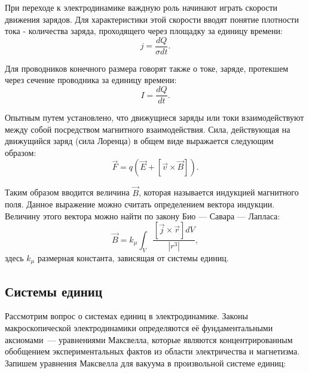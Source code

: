 При переходе к электродинамике важдную роль начинают играть скорости движения зарядов. Для характеристики этой скорости вводят понятие плотности тока - количества заряда, проходящего через площадку за единицу времени:
\begin{equation}
	j = \frac{dQ}{\sigma dt}.
\end{equation}

Для проводников конечного размера говорят также о токе, заряде, протекшем через сечение проводника за единицу времени:
\begin{equation}
\label{eq:current}
	I = \frac{dQ}{dt}.
\end{equation}

Опытным путем установлено, что движущиеся заряды или токи взаимодействуют между собой посредством магнитного взаимодействия. Сила, действующая на движущийся заряд (сила Лоренца) в общем виде выражается следующим образом:
\begin{equation}
	\vec{F} = q \left( \vec{E} + \left[ \vec{v} \times \vec{B}\right] \right).
\end{equation}

Таким образом вводится величина $\vec{B}$, которая называется индукцией магнитного поля. Данное выражение можно считать определением вектора индукции. Величину этого вектора можно найти по закону Био — Савара — Лапласа:
\begin{equation}
	\vec{B} = k_{\mu}\int_{V}{\frac{\left[ \vec{j} \times \vec{r}\right] dV}{\left| r^3 \right| }},
\end{equation}
здесь $k_{\mu}$ размерная константа, зависящая от системы единиц.

\subsection{Системы единиц}

Рассмотрим вопрос о системах единиц в электродинамике. Законы макроскопической электродинамики определяются её фундаментальными аксиомами~--- уравнениями Максвелла, которые являются концентрированным обобщением экспериментальных фактов из области электричества и магнетизма. Запишем уравнения Максвелла для вакуума в произвольной системе единиц:



